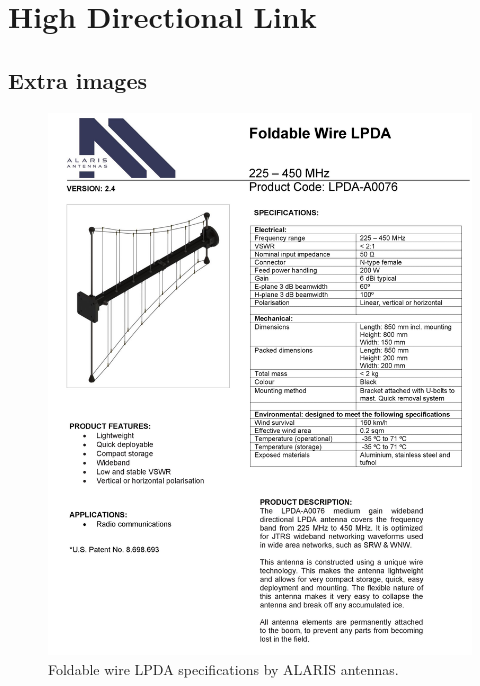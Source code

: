 \chapter{High Directional Link}

\section{Extra images}
\begin{figure}[htb]
    \centering
    \includegraphics[width=1\textwidth]{figures/Yannis/LPDA.jpg}
    \caption{Foldable wire LPDA specifications by ALARIS antennas.}
    \label{LPDA1}
\end{figure}

